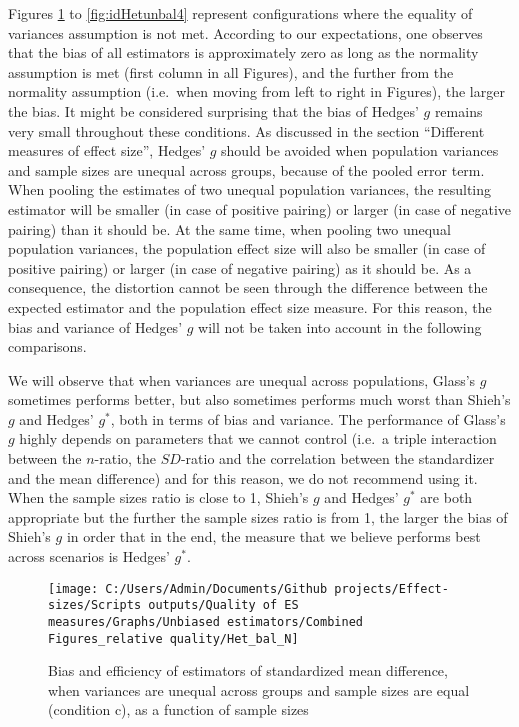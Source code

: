 \documentclass[
  12pt,
  french,
]{article}
\begin{document}
Figures \ref{fig:idHetbal1} to \ref{fig:idHetunbal4} represent
configurations where the equality of variances assumption is not met.
According to our expectations, one observes that the bias of all
estimators is approximately zero as long as the normality assumption is
met (first column in all Figures), and the further from the normality
assumption (i.e.~when moving from left to right in Figures), the larger
the
bias.
It might be considered surprising that the bias of Hedges' \(g\) remains
very small throughout these conditions. As discussed in the section
``Different measures of effect size'', Hedges' \(g\) should be avoided
when population variances and sample sizes are unequal across groups,
because of the pooled error term. When pooling the estimates of two
unequal population variances, the resulting estimator will be smaller
(in case of positive pairing) or larger (in case of negative pairing)
than it should be. At the same time, when pooling two unequal population
variances, the population effect size will also be smaller (in case of
positive pairing) or larger (in case of negative pairing) as it should
be. As a consequence, the distortion cannot be seen through the
difference between the expected estimator and the population effect size
measure. For this reason, the bias and variance of Hedges' \(g\) will
not be taken into account in the following comparisons.

We will observe that when variances are unequal across populations,
Glass's \(g\) sometimes performs better, but also sometimes performs
much worst than Shieh's \(g\) and Hedges' \(g^*\), both in terms of bias
and variance. The performance of Glass's \(g\) highly depends on
parameters that we cannot control (i.e.~a triple interaction between the
\(n\)-ratio, the \(SD\)-ratio and the correlation between the
standardizer and the mean difference) and for this reason, we do not
recommend using it. When the sample sizes ratio is close to 1, Shieh's
\(g\) and Hedges' \(g^*\) are both appropriate but the further the
sample sizes ratio is from 1, the larger the bias of Shieh's \(g\) in
order that in the end, the measure that we believe performs best across
scenarios is Hedges' \(g^*\).

\begin{figure}

{\centering \texttt{[image: C:/Users/Admin/Documents/Github projects/Effect-sizes/Scripts outputs/Quality of ES measures/Graphs/Unbiased estimators/Combined Figures\_relative quality/Het\_bal\_N]} 

}

\caption{Bias and efficiency of estimators of standardized mean difference, when variances are unequal across groups and sample sizes are equal (condition c), as a function of sample sizes}\label{fig:idHetbal1}
\end{figure}
\end{document}
